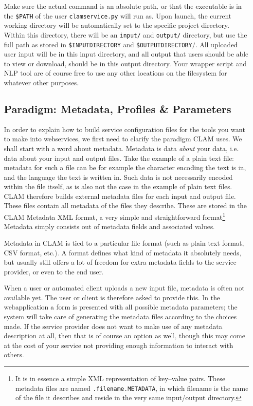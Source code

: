 \documentclass[a4paper,12pt]{report}
\begin{document}
Make sure the actual command is an absolute path, or that the executable is in the \texttt{\$PATH} of the user \texttt{clamservice.py} will run as. Upon launch, the current working directory will be automatically set to the specific project directory. Within this directory, there will be an \texttt{input/} and \texttt{output/} directory, but use the full path as stored in \texttt{\$INPUTDIRECTORY} and \texttt{\$OUTPUTDIRECTORY}/. All uploaded user input will be in this input directory, and all output that users should be able to view or download, should be in this output directory. Your wrapper script and NLP tool are of course free to use any other locations on the filesystem for whatever other purposes.


\subsection{Paradigm: Metadata, Profiles \& Parameters}

In order to explain how to build service configuration files for the tools you want to make into webservices, we first need to clarify the paradigm CLAM uses. We shall start with a word about metadata. Metadata is data \emph{about}\/ your data, i.e. data about your input and output files. Take the example of a plain text file: metadata for such a file can be for example the character encoding the text is in, and the language the text is written in. Such data is not necessarily encoded within the file itself, as is also not the case in the example of plain text files. CLAM therefore builds external metadata files for each input and output file. These files contain all metadata of the files they describe. These are stored in the CLAM Metadata XML format, a very simple and straightforward format\footnote{It is in essence a simple XML representation of key--value pairs. These metadata files are named \texttt{.filename.METADATA}, in which filename is the name of the file it describes and reside in the very same input/output directory.} Metadata simply consists out of metadata fields and associated values.

Metadata in CLAM is tied to a particular file format (such as plain text format, CSV format, etc.). A format defines what kind of metadata it absolutely needs, but usually still offers a lot of freedom for extra metadata fields to the service provider, or even to the end user. 

When a user or automated client uploads a new input file, metadata is often not available yet. The user or client is therefore asked to provide this. In the webapplication a form is presented with all possible metadata parameters; the system will take care of generating the metadata files according to the choices made. If the service provider does not want to make use of any metadata description at all, then that is of course an option as well, though this may come at the cost of your service not providing enough information to interact with others.
\end{document}
